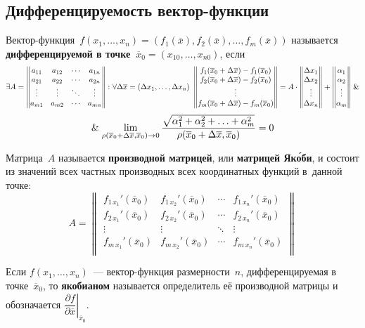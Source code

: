 \subsection{Дифференцируемость вектор-функции}
 Вектор-функция~$f(x_1, \ldots, x_n) = (f_1(\overline x), f_2(\overline x), \ldots, f_m(\overline x))$ называется \textbf{дифференцируемой в точке~$\overline x_0 = (x_{10}, \ldots, x_{n0})$}, если
\begin{equation*}
\exists A =
\begin{Vmatrix}
a_{11} & a_{12} & \cdots & a_{1n} \\
a_{21} & a_{22} & \cdots & a_{2n} \\
\vdots & \vdots & \ddots & \vdots \\
a_{m1} & a_{m2} & \cdots & a_{mn}
\end{Vmatrix} \colon
\forall \Delta \overline x = (\Delta x_1, \ldots, \Delta x_n) \
\begin{Vmatrix}
f_1(\overline x_0 + \Delta \overline x) - f_1(\overline x_0) \\
f_2(\overline x_0 + \Delta \overline x) - f_2(\overline x_0) \\
\vdots \\
f_m(\overline x_0 + \Delta \overline x) - f_m(\overline x_0)
\end{Vmatrix} =
A \cdot
\begin{Vmatrix}
\Delta x_1 \\
\Delta x_2 \\
\vdots \\
\Delta x_n
\end{Vmatrix} +
\begin{Vmatrix}
\alpha_1 \\
\alpha_2 \\
\vdots \\
\alpha_m
\end{Vmatrix} \mathrel{\&}
\end{equation*}
\begin{equation*}
\mathrel{\&} \lim_{\rho(\overline x_0 + \Delta \overline x, \overline x_0) \to 0}
\frac{\sqrt{\alpha_1^2 + \alpha_2^2 + \ldots + \alpha_m^2}}
{\rho(\overline x_0 + \Delta \overline x, \overline x_0)} = 0
\end{equation*}

  Матрица~$A$ называется \textbf{производной матрицей}, или \textbf{матрицей Як\'{о}би}, и состоит из значений всех частных производных всех координатных функций в~данной точке:
\begin{equation*}
A =
\begin{Vmatrix}
f_{1\, x_1}'(\overline x_0) & f_{1\, x_2}'(\overline x_0) & \cdots & f_{1\, x_n}'(\overline x_0) \\
f_{2\, x_1}'(\overline x_0) & f_{2\, x_2}'(\overline x_0) & \cdots & f_{2\, x_n}'(\overline x_0) \\
\vdots & \vdots & \ddots & \vdots \\
f_{m\, x_1}'(\overline x_0) & f_{m\, x_2}'(\overline x_0) & \cdots & f_{m\, x_n}'(\overline x_0) \\
\end{Vmatrix}
\end{equation*}

 Если $f(x_1, \ldots, x_n)$~--- вектор-функция размерности~$n$, дифференцируемая в точке~$\overline x_0$, то \textbf{якобианом} называется определитель её производной матрицы и обозначается $\left. \dfrac{\partial f}{\partial \overline x} \right|_{\overline x_0}$.